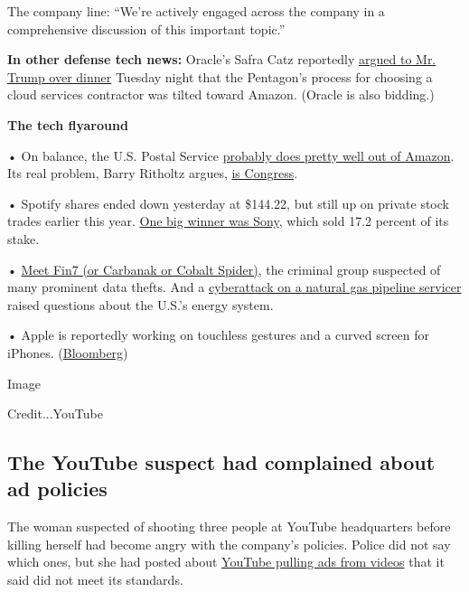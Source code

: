 The company line: ``We're actively engaged across the company in a
comprehensive discussion of this important topic.''

\textbf{In other defense tech news:} Oracle's Safra Catz reportedly
\href{https://www.bloomberg.com/news/articles/2018-04-04/oracle-s-catz-is-said-to-raise-amazon-contract-fight-with-trump?dlbk}{argued
to Mr. Trump over dinner} Tuesday night that the Pentagon's process for
choosing a cloud services contractor was tilted toward Amazon. (Oracle
is also bidding.)

\textbf{The tech flyaround}

• On balance, the U.S. Postal Service
\href{https://www.nytimes3xbfgragh.onion/2018/04/04/technology/amazon-postal-service-trump.html?dlbk}{probably
does pretty well out of Amazon}. Its real problem, Barry Ritholtz
argues,
\href{https://www.bloomberg.com/view/articles/2018-04-04/congress-not-amazon-messed-up-the-u-s-postal-service}{is
Congress}.

• Spotify shares ended down yesterday at \$144.22, but still up on
private stock trades earlier this year.
\href{https://www.nytimes3xbfgragh.onion/2018/04/04/business/media/as-spotify-goes-public-sony-cashes-in.html?dlbk}{One
big winner was Sony}, which sold 17.2 percent of its stake.

•
\href{https://www.wired.com/story/fin7-carbanak-hacking-group-behind-a-string-of-big-breaches?dlbk}{Meet
Fin7 (or Carbanak or Cobalt Spider)}, the criminal group suspected of
many prominent data thefts. And a
\href{https://www.nytimes3xbfgragh.onion/2018/04/04/business/energy-environment/pipeline-cyberattack.html?dlbk}{cyberattack
on a natural gas pipeline servicer} raised questions about the U.S.'s
energy system.

• Apple is reportedly working on touchless gestures and a curved screen
for iPhones.
(\href{https://www.bloomberg.com/news/articles/2018-04-04/apple-is-said-to-work-on-touchless-control-curved-iphone-screen?dlbk}{Bloomberg})

Image

Credit...YouTube

\hypertarget{the-youtube-suspect-had-complained-about-ad-policies}{%
\subsection{The YouTube suspect had complained about ad
policies}\label{the-youtube-suspect-had-complained-about-ad-policies}}

The woman suspected of shooting three people at YouTube headquarters
before killing herself had become angry with the company's policies.
Police did not say which ones, but she had posted about
\href{https://www.nytimes3xbfgragh.onion/2018/04/04/technology/youtube-attacker-demonetization.html?rref=collection\%2Fsectioncollection\%2Fbusiness}{YouTube
pulling ads from videos} that it said did not meet its standards.

